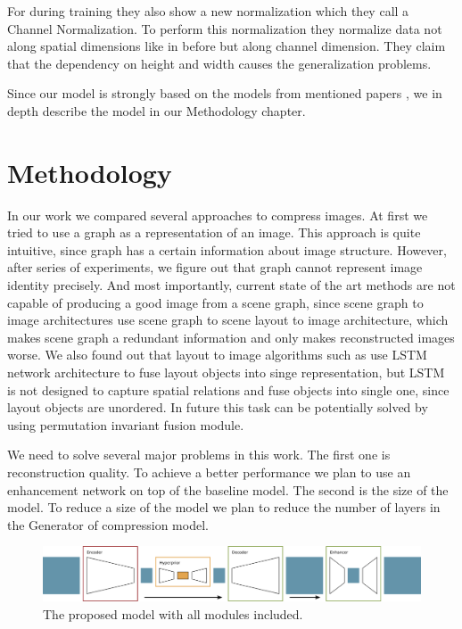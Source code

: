 For during training they also show a new normalization which they call a Channel Normalization. To perform this normalization they normalize data not along spatial dimensions like in before \cite{batch_norm, layer_norm,instance_norm} but along channel dimension. They claim that the dependency on height and width causes the generalization problems.

Since our model is strongly based on the models from mentioned papers \cite{mentzer_high_fidelity_2020,balle_variational_2018,agustsson_generative_2019}, we in depth describe the model in our Methodology chapter.

\chapter{Methodology}
\label{chapter:methodology}

In our work we compared several approaches to compress images. At first we tried to use a graph as a representation of an image. This approach is quite intuitive, since graph has a certain information about image structure. However, after series of experiments, we figure out that graph cannot represent image identity precisely. And most importantly, current state of the art methods are not capable of producing a good image from a scene graph, since scene graph to image architectures use scene graph to scene layout to image architecture, which makes scene graph a redundant information and only makes reconstructed images worse. We also found out that layout to image algorithms such as \cite{Zhao_Meng_Yin_Sigal_2019} use LSTM network architecture to fuse layout objects into singe representation, but LSTM is not designed to capture spatial relations and fuse objects into single one, since layout objects are unordered. In future this task can be potentially solved by using permutation invariant fusion module.

We need to solve several major problems in this work. The first one is reconstruction quality. To achieve a better performance we plan to use an enhancement network on top of the baseline model. The second is the size of the model. To reduce a size of the model we plan to reduce the number of layers in the Generator of compression model.

\begin{figure}[!ht]
    \label{general-enhancement}
    \includegraphics[width=\textwidth]{figure/general-enhance.png}
    \caption{The proposed model with all modules included.}
\end{figure}

